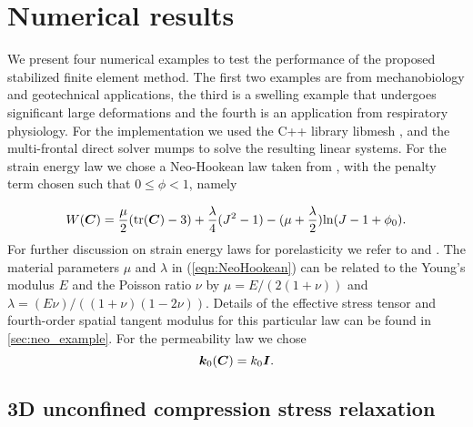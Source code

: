 \section{Numerical results}
\label{sec:results}

We  present four numerical examples to test the performance of the proposed stabilized finite element method. The first two examples are from mechanobiology and geotechnical applications, the third is a swelling example that undergoes significant large deformations and the fourth is an application from respiratory physiology. For the implementation we used the C++ library libmesh \cite{kirk2007libmesh}, and the multi-frontal direct solver mumps \cite{amestoy2000multifrontal} to solve the resulting linear systems. For the strain energy law we chose a Neo-Hookean law taken from \cite[eqn. (3.119)]{wriggers2008nonlinear}, with the penalty term chosen such that $0\leq\phi<1$, namely

\begin{equation}
W(\boldsymbol{C})=\frac{\mu}{2}(\mbox{tr}(\boldsymbol{C})-3)+\frac{\lambda}{4}(J^{2}-1)-(\mu+\frac{\lambda}{2})\mbox{ln}(J-1+\phi_{0}).
\label{eqn:NeoHookean}
\end{equation}
For further discussion on strain energy laws for porelasticity we refer to \cite{chapelle2014general} and \cite{vuong2014general}. The material parameters $\mu$ and $\lambda$ in (\ref{eqn:NeoHookean}) can be related to the Young's modulus $E$ and the Poisson ratio $\nu$ by $\mu=E/(2(1+\nu))$ and  $\lambda=(E\nu)/((1+\nu)(1-2\nu))$. Details of the effective stress tensor and fourth-order spatial tangent modulus for this particular law can be found in \ref{sec:neo_example}. For the permeability law we chose
\begin{equation}
\boldsymbol{k}_{0}(\boldsymbol{C})=k_{0}\boldsymbol{I}.
\end{equation}


\subsection{3D unconfined compression stress relaxation}
\label{sec:unconfined}

